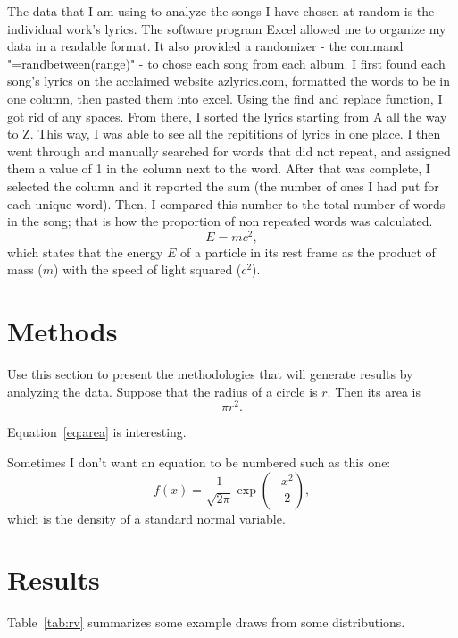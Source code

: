 \documentclass[12pt]{article}
\begin{document}
The data that I am using to analyze the songs I have chosen at random is the individual work's lyrics. The software program Excel allowed me to organize my data in a readable format. It also provided a randomizer - the command "=randbetween(range)" - to chose each song from each album. I first found each song's lyrics on the acclaimed website azlyrics.com, formatted the words to be in one column, then pasted them into excel. Using the find and replace function, I got rid of any spaces. From there, I sorted the lyrics starting from A all the way to Z. This way, I was able to see all the repititions of lyrics in one place. I then went through and manually searched for words that did not repeat, and assigned them a value of 1 in the column next to the word. After that was complete, I selected the column and it reported the sum (the number of ones I had put for each unique word). Then, I compared this number to the total number of words in the song; that is how the proportion of non repeated words was calculated.  
\begin{equation}
  \label{eq:mc2}
  E = m c^2,
\end{equation}
which states that the energy $E$ of a particle in its rest frame as the product
of mass ($m$) with the speed of light squared ($c^2$).


\section{Methods}
\label{sec:meth}

Use this section to present the methodologies that will generate results by
analyzing the data. Suppose that the radius of a circle is $r$. Then its area is
\begin{equation}
  \label{eq:area}
  \pi r^2.
\end{equation}

Equation~\eqref{eq:area} is interesting. 

Sometimes I don't want an equation to be numbered such as this one:
\[
  f(x) = \frac{1}{\sqrt{2\pi}} \exp\left( - \frac{x^2}{2} \right),
\]
which is the density of a standard normal variable.



\section{Results}
\label{sec:resu}

Table~\ref{tab:rv} summarizes some example draws from some distributions.
\end{document}
